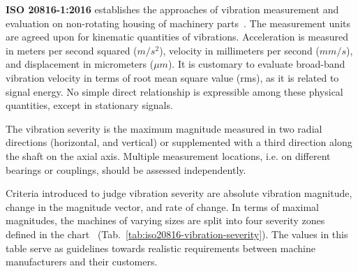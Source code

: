 \textbf{ISO 20816-1:2016} establishes the approaches of vibration measurement and evaluation on non-rotating housing of machinery parts~\cite{noauthor_iso_2016}. The measurement units are agreed upon for kinematic quantities of vibrations. Acceleration is measured in meters per second squared ($m/s^2$), velocity in millimeters per second ($mm/s$), and displacement in micrometers ($\mu m$). It is customary to evaluate broad-band vibration velocity in terms of root mean square value (rms), as it is related to signal energy. No simple direct relationship is expressible among these physical quantities, except in stationary signals.

The vibration severity is the maximum magnitude measured in two radial directions (horizontal, and vertical) or supplemented with a third direction along the shaft on the axial axis. Multiple measurement locations, i.e. on different bearings or couplings, should be assessed independently.

Criteria introduced to judge vibration severity are absolute vibration magnitude, change in the magnitude vector, and rate of change. In terms of maximal magnitudes, the machines of varying sizes are split into four severity zones defined in the chart ~(Tab.~\ref{tab:iso20816-vibration-severity}). The values in this table serve as guidelines towards realistic requirements between machine manufacturers and their customers.

